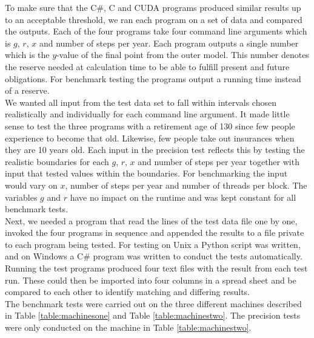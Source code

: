 To make sure that the C\#, C and CUDA programs produced similar results up to an acceptable threshold, we ran each program on a set of data and compared the outputs. Each of the four programs take four command line arguments which is $g$, $r$, $x$ and number of steps per year. Each program outputs a single number which is the $y$-value of the final point from the outer model. This number denotes the reserve needed at calculation time to be able to fulfill present and future obligations. For benchmark testing the programs output a running time instead of a reserve.\\

We wanted all input from the test data set to fall within intervals chosen realistically and individually for each command line argument. It made little sense to test the three programs with a retirement age of 130 since few people experience to become that old. Likewise, few people take out insurances when they are 10 years old. Each input in the precision test reflects this by testing the realistic boundaries for each $g$, $r$, $x$ and number of steps per year together with input that tested values within the boundaries. For benchmarking the input would vary on $x$, number of steps per year and number of threads per block. The variables $g$ and $r$ have no impact on the runtime and was kept constant for all benchmark tests.\\

Next, we needed a program that read the lines of the test data file one by one, invoked the four programs in sequence and appended the results to a file private to each program being tested. For testing on Unix a Python script was written, and on Windows a C\# program was written to conduct the tests automatically.\\

Running the test programs produced four text files with the result from each test run. These could then be imported into four columns in a spread sheet and be compared to each other to identify matching and differing results.\\

The benchmark tests were carried out on the three different machines described in Table \ref{table:machinesone} and Table \ref{table:machinestwo}. The precision tests were only conducted on the machine in Table \ref{table:machinestwo}.

